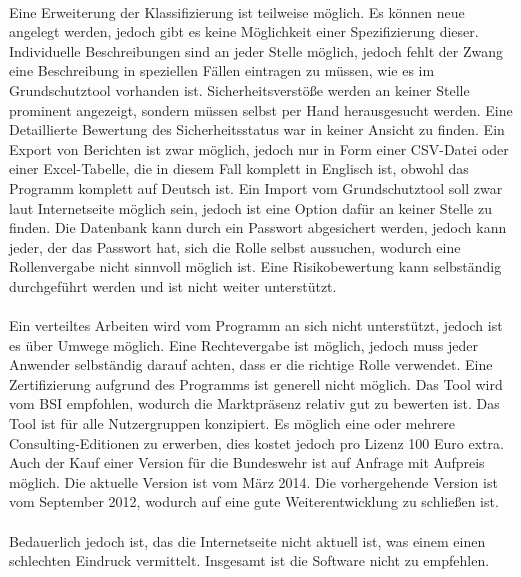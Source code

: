 \\
Eine Erweiterung der Klassifizierung ist teilweise möglich. Es können neue angelegt werden, jedoch gibt es keine Möglichkeit einer Spezifizierung dieser. Individuelle Beschreibungen sind an jeder Stelle möglich, jedoch fehlt der Zwang eine Beschreibung in speziellen Fällen eintragen zu müssen, wie es im Grundschutztool vorhanden ist. Sicherheitsverstöße werden an keiner Stelle prominent angezeigt, sondern müssen selbst per Hand herausgesucht werden. Eine Detaillierte Bewertung des Sicherheitsstatus war in keiner Ansicht zu finden. Ein Export von Berichten ist zwar möglich, jedoch nur in Form einer CSV-Datei oder einer Excel-Tabelle, die in diesem Fall komplett in Englisch ist, obwohl das Programm komplett auf Deutsch ist. Ein Import vom Grundschutztool soll zwar laut Internetseite möglich sein, jedoch ist eine Option dafür an keiner Stelle zu finden. Die Datenbank kann durch ein Passwort abgesichert werden, jedoch kann jeder, der das Passwort hat, sich die Rolle selbst aussuchen, wodurch eine Rollenvergabe nicht sinnvoll möglich ist. Eine Risikobewertung kann selbständig durchgeführt werden und ist nicht weiter unterstützt.\\
\\
Ein verteiltes Arbeiten wird vom Programm an sich nicht unterstützt, jedoch ist es über Umwege möglich. Eine Rechtevergabe ist möglich, jedoch muss jeder Anwender selbständig darauf achten, dass er die richtige Rolle verwendet. Eine Zertifizierung aufgrund des Programms ist generell nicht möglich. Das Tool wird vom BSI empfohlen, wodurch die Marktpräsenz relativ gut zu bewerten ist. Das Tool ist für alle Nutzergruppen konzipiert. Es möglich eine oder mehrere Consulting-Editionen zu erwerben, dies kostet jedoch pro Lizenz 100 Euro extra. Auch der Kauf einer Version für die Bundeswehr ist auf Anfrage mit Aufpreis möglich. Die aktuelle Version ist vom März 2014. Die vorhergehende Version ist vom September 2012, wodurch auf eine gute Weiterentwicklung zu schließen ist.\\
\\
Bedauerlich jedoch ist, das die Internetseite nicht aktuell ist, was einem einen schlechten Eindruck vermittelt. Insgesamt ist die Software nicht zu empfehlen.